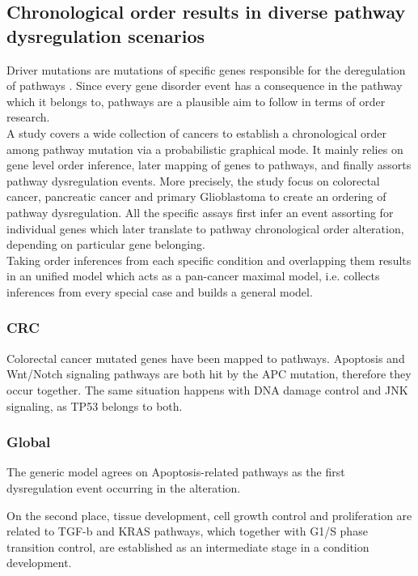 \subsection{Chronological order results in diverse pathway dysregulation scenarios}

Driver mutations are mutations of specific genes responsible for the deregulation of pathways \cite{Ascolani2019ModelingMatter}. Since every gene disorder event has a consequence in the pathway which it belongs to, pathways are a plausible aim to follow in terms of order research.
\\

A study \cite{Gerstung2011TheTumorigenesis} covers a wide collection of cancers to establish a chronological order among pathway mutation via a probabilistic graphical mode. It mainly relies on gene level order inference, later mapping of genes to pathways, and finally assorts pathway dysregulation events. More precisely, the study focus on colorectal cancer, pancreatic cancer and primary Glioblastoma to create an ordering of pathway dysregulation. All the specific assays first infer an event assorting for individual genes which later translate to pathway chronological order alteration, depending on particular gene belonging.\\

Taking order inferences from each specific condition and overlapping them results in an unified model which acts as a pan-cancer maximal model, i.e. collects inferences from every special case and builds a general model.
\\

\subsubsection{CRC}
Colorectal cancer mutated genes have been mapped to pathways. Apoptosis and Wnt/Notch signaling pathways are both hit by the APC mutation, therefore they occur together. The same situation happens with DNA damage control and JNK signaling, as TP53 belongs to both.

\subsubsection{Global}
The generic model agrees on Apoptosis-related pathways as the first dysregulation event occurring in the alteration. 

On the second place, tissue development, cell growth control and proliferation are related to TGF-b and KRAS pathways, which together with G1/S phase transition control, are established as an intermediate stage in a condition development.

